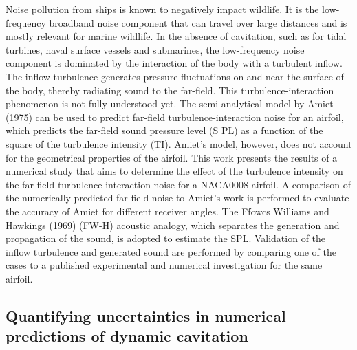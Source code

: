 \documentclass[a4paper,10pt]{article}
\begin{document}
Noise pollution from ships is known to negatively impact wildlife. It is the low-frequency broadband noise component that can travel over large distances and is mostly relevant for marine wildlife. In the absence of cavitation, such as for tidal turbines, naval surface vessels and submarines, the low-frequency noise component is dominated by the interaction of the body with a turbulent inflow. The inflow turbulence generates pressure fluctuations on and near the surface of the body, thereby radiating sound to the far-field. This turbulence-interaction phenomenon is not fully understood yet. The semi-analytical model by Amiet (1975) can be used to predict far-field turbulence-interaction noise for an airfoil, which predicts the far-field sound pressure level (S PL) as a function of the square of the turbulence intensity (TI). Amiet’s model, however, does not account for the geometrical properties of the airfoil. This work presents the results of a numerical study that aims to determine the effect of the turbulence intensity on the far-field turbulence-interaction noise for a NACA0008 airfoil. A comparison of the numerically predicted far-field noise to Amiet’s work is performed to evaluate the accuracy of Amiet for different receiver angles. The Ffowcs Williams and Hawkings (1969) (FW-H) acoustic analogy, which separates the generation and propagation of the sound, is adopted to estimate the SPL. Validation of the inflow turbulence and generated sound are performed by comparing one of the cases to a published experimental and numerical investigation for the same airfoil.

\subsection{Quantifying uncertainties in numerical predictions of dynamic cavitation \cite{kara_quantifying_2023}}
\end{document}
